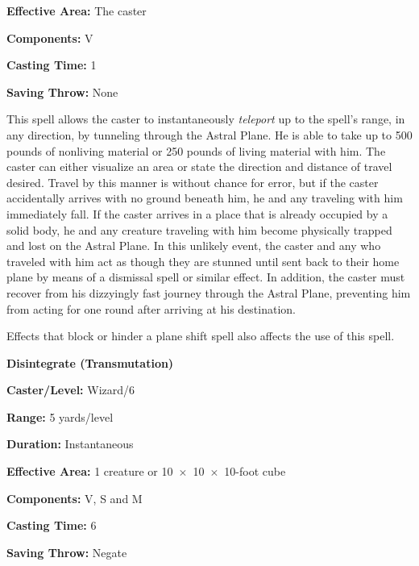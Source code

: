 \begin{multicols}{2}
\begin{minipage}{\columnwidth}
\noindent \textbf{Effective Area:} The caster

\noindent \textbf{Components:} V

\noindent \textbf{Casting Time:} 1

\noindent \textbf{Saving Throw:} None

\end{minipage}

This spell allows the caster to instantaneously \textit{teleport} up to the spell's range, in any direction, by tunneling through the Astral Plane.  He is able to take up to 500 pounds of nonliving material or 250 pounds of living material with him.  The caster can either visualize an area or state the direction and distance of travel desired.  Travel by this manner is without chance for error, but if the caster accidentally arrives with no ground beneath him, he and any traveling with him immediately fall.  If the caster arrives in a place that is already occupied by a solid body, he and any creature traveling with him become physically trapped and lost on the Astral Plane.  In this unlikely event, the caster and any who traveled with him act as though they are stunned until sent back to their home plane by means of a dismissal spell or similar effect.  In addition, the caster must recover from his dizzyingly fast journey through the Astral Plane, preventing him from acting for one round after arriving at his destination.

Effects that block or hinder a plane shift spell also affects the use of this spell.

\vspace{1em}

\noindent
\begin{minipage}{\columnwidth}

\noindent \textbf{Disintegrate (Transmutation)}

\noindent \textbf{Caster/Level:} Wizard/6

\noindent \textbf{Range:} 5 yards/level

\noindent \textbf{Duration:} Instantaneous

\noindent \textbf{Effective Area:} 1 creature or 10~$\times$~10~$\times$~10-foot cube

\noindent \textbf{Components:} V, S and M

\noindent \textbf{Casting Time:} 6

\noindent \textbf{Saving Throw:} Negate

\end{minipage}


\end{multicols}
